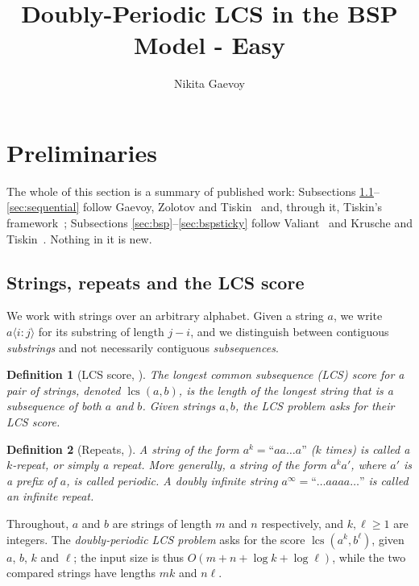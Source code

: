 \documentclass[10pt]{article}
\title{Doubly-Periodic LCS in the BSP Model - Easy}
\author{Nikita Gaevoy}
\date{}
\newtheorem{definition}{Definition}
\newcommand{\lcs}{\operatorname{lcs}}
\begin{document}
\maketitle

\section{Preliminaries}

The whole of this section is a summary of published work: Subsections
\ref{sec:strings}--\ref{sec:sequential} follow Gaevoy, Zolotov and
Tiskin~\cite{GZT25} and, through it, Tiskin's
framework~\cite{Tiskin08,TiskinArXiv,Tiskin15,Tiskin09}; Subsections
\ref{sec:bsp}--\ref{sec:bspsticky} follow Valiant~\cite{Valiant90} and
Krusche and Tiskin~\cite{KT07,KT10,KruscheThesis}. Nothing in it is new.

\subsection{Strings, repeats and the LCS score}\label{sec:strings}

We work with strings over an arbitrary alphabet. Given a string $a$, we write
$a\langle i:j\rangle$ for its substring of length $j-i$, and we distinguish
between contiguous \emph{substrings} and not necessarily contiguous
\emph{subsequences}.

\begin{definition}[LCS score, {\cite[Definition 1]{GZT25}}]
The \emph{longest common subsequence} (LCS) score for a pair of strings,
denoted $\lcs(a,b)$, is the length of the longest string that is a
subsequence of both $a$ and $b$. Given strings $a,b$, the \emph{LCS problem}
asks for their LCS score.
\end{definition}

\begin{definition}[Repeats, {\cite[Definition 2]{GZT25}}]
A string of the form $a^k=\text{``}aa\ldots a\text{''}$ ($k$ times) is called
a \emph{$k$-repeat}, or simply a \emph{repeat}. More generally, a string of
the form $a^ka'$, where $a'$ is a prefix of $a$, is called \emph{periodic}. A
doubly infinite string $a^\infty=\text{``}\ldots aaaa\ldots\text{''}$ is
called an \emph{infinite repeat}.
\end{definition}

Throughout, $a$ and $b$ are strings of length $m$ and $n$ respectively, and
$k,\ell\ge 1$ are integers. The \emph{doubly-periodic LCS problem} asks for
the score $\lcs(a^k,b^\ell)$, given $a$, $b$, $k$ and $\ell$; the input size
is thus $O(m+n+\log k+\log\ell)$, while the two compared strings have lengths
$mk$ and $n\ell$.
\end{document}
